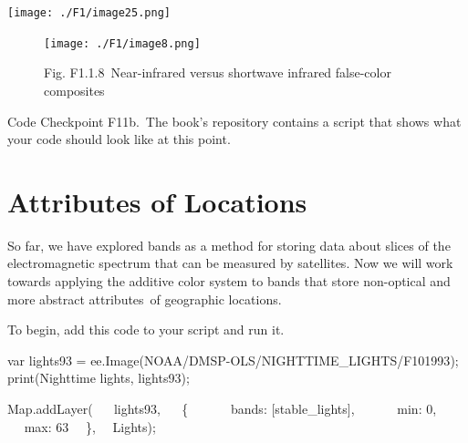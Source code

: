 \documentclass[
  letterpaper,
  DIV=11,
  numbers=noendperiod]{scrreprt}
\newenvironment{Shaded}{\begin{snugshade}}{\end{snugshade}}
\newcommand{\BuiltInTok}[1]{\textcolor[rgb]{0.00,0.23,0.31}{#1}}
\newcommand{\DataTypeTok}[1]{\textcolor[rgb]{0.68,0.00,0.00}{#1}}
\newcommand{\DecValTok}[1]{\textcolor[rgb]{0.68,0.00,0.00}{#1}}
\newcommand{\ErrorTok}[1]{\textcolor[rgb]{0.68,0.00,0.00}{#1}}
\newcommand{\FunctionTok}[1]{\textcolor[rgb]{0.28,0.35,0.67}{#1}}
\newcommand{\KeywordTok}[1]{\textcolor[rgb]{0.00,0.23,0.31}{#1}}
\newcommand{\NormalTok}[1]{\textcolor[rgb]{0.00,0.23,0.31}{#1}}
\newcommand{\OperatorTok}[1]{\textcolor[rgb]{0.37,0.37,0.37}{#1}}
\newcommand{\StringTok}[1]{\textcolor[rgb]{0.13,0.47,0.30}{#1}}
\begin{document}
\texttt{[image: ./F1/image25.png]}

\begin{figure}

{\centering \texttt{[image: ./F1/image8.png]}

}

\caption{Fig. F1.1.8~Near-infrared versus shortwave infrared false-color
composites}

\end{figure}

\begin{tcolorbox}[enhanced jigsaw, left=2mm, breakable, rightrule=.15mm, opacityback=0, colframe=quarto-callout-note-color-frame, colbacktitle=quarto-callout-note-color!10!white, arc=.35mm, opacitybacktitle=0.6, toptitle=1mm, colback=white, leftrule=.75mm, title=\textcolor{quarto-callout-note-color}{\faInfo}\hspace{0.5em}{Note}, toprule=.15mm, bottomtitle=1mm, titlerule=0mm, bottomrule=.15mm, coltitle=black]

Code Checkpoint F11b.~The book's repository contains a script that shows
what your code should look like at this point.

\end{tcolorbox}

\hypertarget{attributes-of-locations}{%
\section{Attributes of Locations}\label{attributes-of-locations}}

So far, we have explored bands as a method for storing data about slices
of the electromagnetic spectrum that can be measured by satellites. Now
we will work towards applying the additive color system to bands that
store non-optical and more abstract attributes~of geographic locations.
~

To begin, add this code to your script and run it. ~

\begin{Shaded}
\begin{Highlighting}[]
\KeywordTok{var}\NormalTok{ lights93 }\OperatorTok{=}\NormalTok{ ee}\OperatorTok{.}\FunctionTok{Image}\NormalTok{(}\StringTok{\textquotesingle{}NOAA/DMSP{-}OLS/NIGHTTIME\_LIGHTS/F101993\textquotesingle{}}\NormalTok{)}\OperatorTok{;}  
\FunctionTok{print}\NormalTok{(}\StringTok{\textquotesingle{}Nighttime lights\textquotesingle{}}\OperatorTok{,}\NormalTok{ lights93)}\OperatorTok{;}  
  
\BuiltInTok{Map}\OperatorTok{.}\FunctionTok{addLayer}\NormalTok{(  }
\NormalTok{   lights93}\OperatorTok{,}  
\NormalTok{   \{  }
      \DataTypeTok{ bands}\OperatorTok{:}\NormalTok{ [}\StringTok{\textquotesingle{}stable\_lights\textquotesingle{}}\NormalTok{]}\OperatorTok{,}  
      \DataTypeTok{ min}\OperatorTok{:} \DecValTok{0}\OperatorTok{,}  
      \DataTypeTok{ max}\OperatorTok{:} \DecValTok{63}\ErrorTok{ }\NormalTok{  \}}\OperatorTok{,}   \StringTok{\textquotesingle{}Lights\textquotesingle{}}\NormalTok{)}\OperatorTok{;}
\end{Highlighting}
\end{Shaded}
\end{document}
